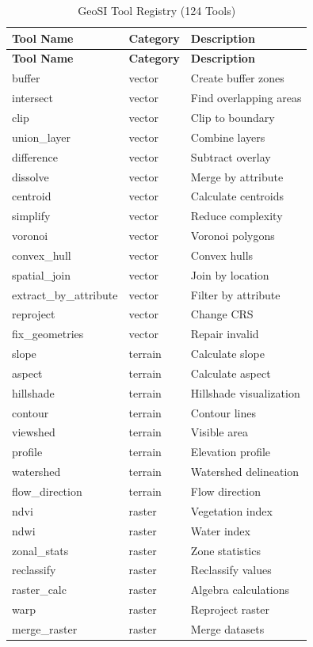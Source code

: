 \documentclass[12pt,a4paper]{report}
\begin{document}
\footnotesize
\begin{longtable}{p{4cm} p{2.2cm} p{7cm}}

\caption{GeoSI Tool Registry (124 Tools)}\\

\toprule
\textbf{Tool Name} & \textbf{Category} & \textbf{Description} \\
\midrule
\endfirsthead

\toprule
\textbf{Tool Name} & \textbf{Category} & \textbf{Description} \\
\midrule
\endhead

buffer & vector & Create buffer zones \\
intersect & vector & Find overlapping areas \\
clip & vector & Clip to boundary \\
union\_layer & vector & Combine layers \\
difference & vector & Subtract overlay \\
dissolve & vector & Merge by attribute \\
centroid & vector & Calculate centroids \\
simplify & vector & Reduce complexity \\
voronoi & vector & Voronoi polygons \\
convex\_hull & vector & Convex hulls \\
spatial\_join & vector & Join by location \\
extract\_by\_attribute & vector & Filter by attribute \\
reproject & vector & Change CRS \\
fix\_geometries & vector & Repair invalid \\

slope & terrain & Calculate slope \\
aspect & terrain & Calculate aspect \\
hillshade & terrain & Hillshade visualization \\
contour & terrain & Contour lines \\
viewshed & terrain & Visible area \\
profile & terrain & Elevation profile \\
watershed & terrain & Watershed delineation \\
flow\_direction & terrain & Flow direction \\

ndvi & raster & Vegetation index \\
ndwi & raster & Water index \\
zonal\_stats & raster & Zone statistics \\
reclassify & raster & Reclassify values \\
raster\_calc & raster & Algebra calculations \\
warp & raster & Reproject raster \\
merge\_raster & raster & Merge datasets \\


\end{longtable}
\end{document}
